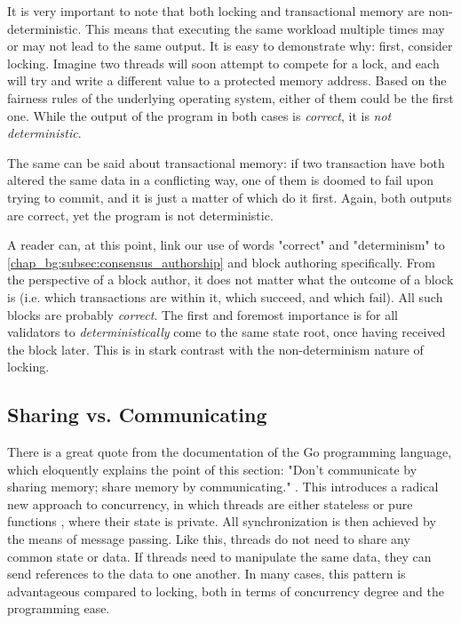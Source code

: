 It is very important to note that both locking and transactional memory are non-deterministic. This
means that executing the same workload multiple times may or may not lead to the same output. It is
easy to demonstrate why: first, consider locking. Imagine two threads will soon attempt to compete
for a lock, and each will try and write a different value to a protected memory address. Based on
the fairness rules of the underlying operating system, either of them could be the first one. While
the output of the program in both cases is \textit{correct}, it is \textit{not deterministic}.

The same can be said about transactional memory: if two transaction have both altered the same data
in a conflicting way, one of them is doomed to fail upon trying to commit, and it is just a matter
of which do it first. Again, both outputs are correct, yet the program is not deterministic.

\begin{remark}
	A reader can, at this point, link our use of words "correct" and "determinism" to
	\ref{chap_bg:subsec:consensus_authorship} and block authoring specifically. From the perspective
	of a block author, it does not matter what the outcome of a block is (i.e. which transactions
	are within it, which succeed, and which fail). All such blocks are probably \textit{correct}.
	The first and foremost importance is for all validators to \textit{deterministically} come to
	the same state root, once having received the block later. This is in stark contrast with the
	non-determinism nature of locking.
\end{remark}


\subsection{Sharing vs. Communicating}\label{chap_bg:subsec:sharing_communication}

There is a great quote from the documentation of the Go programming language, which eloquently
explains the point of this section: "Don't communicate by sharing memory; share memory by
communicating." \cite{ShareMemoryCommunicating}. This introduces a radical new approach to
concurrency, in which threads are either stateless or pure functions
\cite{MostlyAdequateMostlyadequateguide}, where their state is private. All synchronization is then
achieved by the means of message passing. Like this, threads do not need to share any common state
or data. If threads need to manipulate the same data, they can send references to the data to one
another. In many cases, this pattern is advantageous compared to locking, both in terms of
concurrency degree and the programming ease.


